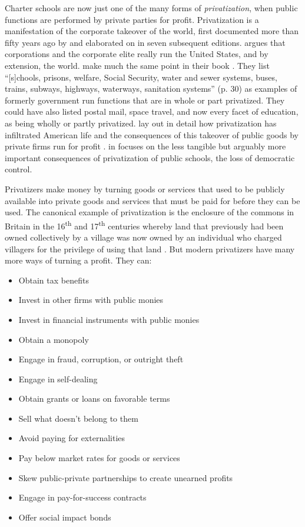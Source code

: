 Charter schools are now just one of the many forms of \textit{privatization}, when public functions are performed by private parties for profit. Privatization is a manifestation of the corporate takeover of the world, first documented more than fifty years ago by \citeauthor{Domhoff2014} and elaborated on in seven subsequent editions. \citeauthor{Domhoff2014} argues that corporations and the corporate elite really run the United States, and by extension, the world. \textcite{Kahn.Minnich2005} make much the same point in their book  \parencite{Kahn.Minnich2005}. They list ``[s]chools, prisons, welfare, Social Security, water and sewer systems, buses, trains, subways, highways, waterways, sanitation systems'' (p. 30) as examples of formerly government run functions that are in whole or part privatized. They could have also listed postal mail, space travel, and now every facet of education, as being wholly or partly privatized. \textcite{Cohen.Mikaelian2021} lay out in detail how privatization has infiltrated American life and the consequences of this takeover of public goods by private firms run for profit  \parencite{Cohen.Mikaelian2021}. \citeauthor{Black2020} in  \parencite{Black2020} focuses on the less tangible but arguably more important consequences of privatization of public schools, the loss of democratic control.

Privatizers make money by turning goods or services that used to be publicly available into private goods and services that must be paid for before they can be used. The canonical example of privatization is the enclosure of the commons in Britain in the 16\textsuperscript{th} and 17\textsuperscript{th} centuries whereby land that previously had been owned collectively by a village was now owned by an individual who charged villagers for the privilege of using that land \parencite{SimonFairlie2009}. But modern privatizers have many more ways of turning a profit. They can:
\begin{itemize}
  \item Obtain tax benefits
  \item Invest in other firms with public monies
  \item Invest in financial instruments with public monies
  \item Obtain a monopoly
  \item Engage in fraud, corruption, or outright theft
  \item Engage in self-dealing
  \item Obtain grants or loans on favorable terms
  \item Sell what doesn't belong to them
  \item Avoid paying for externalities
  \item Pay below market rates for goods or services
  \item Skew public-private partnerships to create unearned profits
  \item Engage in pay-for-success contracts
  \item Offer social impact bonds
\end{itemize}

